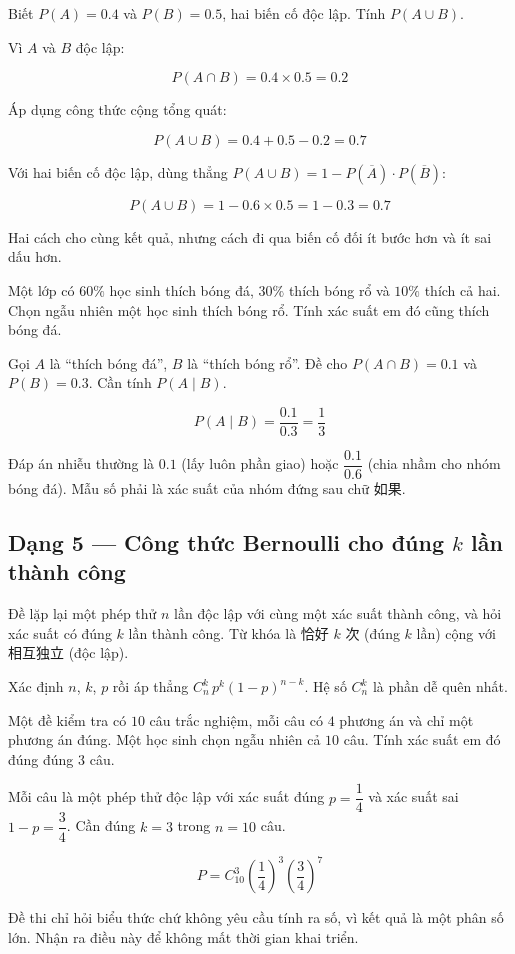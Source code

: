 \documentclass[11pt, a4paper]{article}
\begin{document}
\begin{vidu}[{4}]
Biết $P(A) = 0.4$ và $P(B) = 0.5$, hai biến cố độc lập. Tính $P(A \cup B)$.

Vì $A$ và $B$ độc lập:

$$P(A \cap B) = 0.4 \times 0.5 = 0.2$$

Áp dụng công thức cộng tổng quát:

$$P(A \cup B) = 0.4 + 0.5 - 0.2 = 0.7$$

 Với hai biến cố độc lập, dùng thẳng $P(A \cup B) = 1 - P(\overline{A}) \cdot P(\overline{B})$:

$$P(A \cup B) = 1 - 0.6 \times 0.5 = 1 - 0.3 = 0.7$$

Hai cách cho cùng kết quả, nhưng cách đi qua biến cố đối ít bước hơn và ít sai dấu hơn.
\end{vidu}
\begin{vidu}[{5}]
Một lớp có $60\%$ học sinh thích bóng đá, $30\%$ thích bóng rổ và $10\%$ thích cả hai. Chọn ngẫu nhiên một học sinh thích bóng rổ. Tính xác suất em đó cũng thích bóng đá.

Gọi $A$ là “thích bóng đá”, $B$ là “thích bóng rổ”. Đề cho $P(A \cap B) = 0.1$ và $P(B) = 0.3$. Cần tính $P(A \mid B)$.

$$P(A \mid B) = \frac{0.1}{0.3} = \frac{1}{3}$$

 Đáp án nhiễu thường là $0.1$ (lấy luôn phần giao) hoặc $\dfrac{0.1}{0.6}$ (chia nhầm cho nhóm bóng đá). Mẫu số phải là xác suất của nhóm đứng sau chữ 如果.

\end{vidu}
\subsection{Dạng 5 — Công thức Bernoulli cho đúng $k$ lần thành công}

 Đề lặp lại một phép thử $n$ lần độc lập với cùng một xác suất thành công, và hỏi xác suất có đúng $k$ lần thành công. Từ khóa là 恰好 $k$ 次 (đúng $k$ lần) cộng với 相互独立 (độc lập).

 Xác định $n$, $k$, $p$ rồi áp thẳng $C_n^k \, p^k (1-p)^{n-k}$. Hệ số $C_n^k$ là phần dễ quên nhất.

\begin{vidu}[{6}]
Một đề kiểm tra có $10$ câu trắc nghiệm, mỗi câu có $4$ phương án và chỉ một phương án đúng. Một học sinh chọn ngẫu nhiên cả $10$ câu. Tính xác suất em đó đúng đúng $3$ câu.

Mỗi câu là một phép thử độc lập với xác suất đúng $p = \dfrac{1}{4}$ và xác suất sai $1 - p = \dfrac{3}{4}$. Cần đúng $k = 3$ trong $n = 10$ câu.

$$P = C_{10}^3 \left(\frac{1}{4}\right)^3 \left(\frac{3}{4}\right)^7$$

 Đề thi chỉ hỏi biểu thức chứ không yêu cầu tính ra số, vì kết quả là một phân số lớn. Nhận ra điều này để không mất thời gian khai triển.

\end{vidu}
\end{document}
